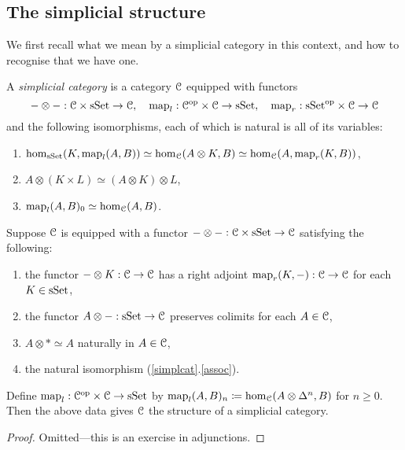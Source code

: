 \subsection{The simplicial structure}

We first recall what we mean by a simplicial category in this context,
and how to recognise that we have one.

\begin{definition}
  \label{simplcat}
  A \emph{simplicial category} is a category $\mathcal{C}$ equipped with
  functors
  \[
  -\otimes- : \mathcal{C} \times \mathrm{s}\mathrm{Set} \to \mathcal{C}, \quad \operatorname{map}_l : \mathcal{C}^{\mathrm{op}} \times \mathcal{C}
  \to \mathrm{s}\mathrm{Set}, \quad \operatorname{map}_r : \mathrm{s}\mathrm{Set}^{\mathrm{op}} \times \mathcal{C} \to \mathcal{C}
  \]
  and the following isomorphisms, each of which is natural is all of
  its variables:
  \begin{enumerate}
  \item \label{twovaradj} $\operatorname{hom}_{\mathrm{s}\mathrm{Set}}(K, \operatorname{map}_l(A,B)) \simeq
    \operatorname{hom}_{\mathcal{C}}(A \otimes K, B) \simeq \operatorname{hom}_{\mathcal{C}}(A, \operatorname{map}_r(K,B))$,
  \item \label{assoc} $A \otimes (K \times L) \simeq (A
    \otimes K) \otimes L$,
  \item \label{agree} $\operatorname{map}_l(A,B)_0 \simeq \operatorname{hom}_{\mathcal{C}}(A,B)$.
  \end{enumerate}
\end{definition}

\begin{lemma}
  Suppose $\mathcal{C}$ is equipped with a functor $-\otimes- : \mathcal{C} \times
  \mathrm{s}\mathrm{Set} \to \mathcal{C}$ satisfying the following:
  \begin{enumerate}
  \item the functor $- \otimes K : \mathcal{C} \to \mathcal{C}$ has a right adjoint
    $\operatorname{map}_r(K,-) : \mathcal{C} \to \mathcal{C}$ for each $K \in \mathrm{s}\mathrm{Set}$,
  \item the functor $A \otimes - : \mathrm{s}\mathrm{Set} \to \mathcal{C}$ preserves colimits
    for each $A \in \mathcal{C}$,
  \item $A \otimes * \simeq A$ naturally in $A \in \mathcal{C}$,
  \item the natural isomorphism (\ref{simplcat}.\ref{assoc}).
  \end{enumerate}
  Define $\operatorname{map}_l : \mathcal{C}^{\mathrm{op}} \times \mathcal{C} \to \mathrm{s}\mathrm{Set}$ by $\operatorname{map}_l(A,B)_n
  \coloneqq \operatorname{hom}_{\mathcal{C}}(A \otimes \Delta^n, B)$ for $n \ge 0$. Then the
  above data gives $\mathcal{C}$ the structure of a simplicial category.
\end{lemma}

\begin{proof}
  Omitted---this is an exercise in adjunctions.
\end{proof}

